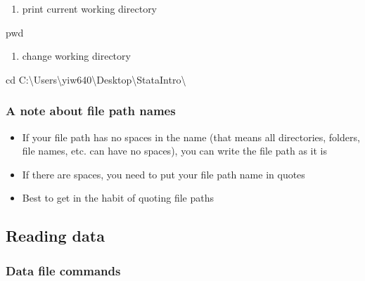 \documentclass[
]{book}
\newenvironment{Shaded}{\begin{snugshade}}{\end{snugshade}}
\newcommand{\NormalTok}[1]{#1}
\providecommand{\tightlist}{%
  \setlength{\itemsep}{0pt}\setlength{\parskip}{0pt}}
\begin{document}
\begin{enumerate}
\def\labelenumi{\arabic{enumi}.}
\tightlist
\item
  print current working directory
\end{enumerate}

\begin{Shaded}
\begin{Highlighting}[]
\NormalTok{pwd }
\end{Highlighting}
\end{Shaded}

\begin{enumerate}
\def\labelenumi{\arabic{enumi}.}
\setcounter{enumi}{1}
\tightlist
\item
  change working directory
\end{enumerate}

\begin{Shaded}
\begin{Highlighting}[]
\NormalTok{cd C:\textbackslash{}Users\textbackslash{}yiw640\textbackslash{}Desktop\textbackslash{}StataIntro\textbackslash{}}
\end{Highlighting}
\end{Shaded}

\hypertarget{a-note-about-file-path-names}{%
\subsubsection{A note about file path names}\label{a-note-about-file-path-names}}

\begin{itemize}
\tightlist
\item
  If your file path has no spaces in the name (that means all directories, folders, file names, etc. can have no spaces), you can write the file path as it is
\item
  If there are spaces, you need to put your file path name in quotes
\item
  Best to get in the habit of quoting file paths
\end{itemize}

\hypertarget{reading-data-2}{%
\subsection{Reading data}\label{reading-data-2}}

\hypertarget{data-file-commands}{%
\subsubsection{Data file commands}\label{data-file-commands}}
\end{document}
